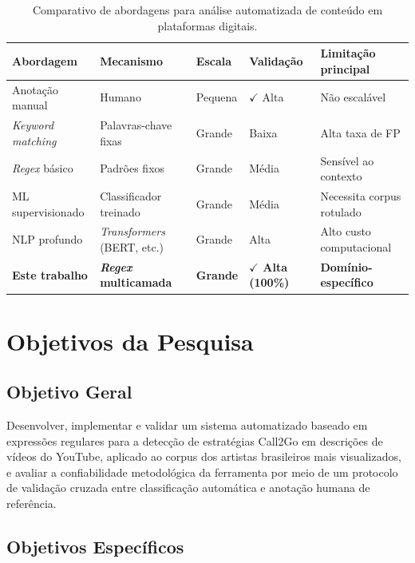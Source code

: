 \documentclass[12pt, a4paper]{article}
\begin{document}
\begin{table}[H]
\centering
\caption{Comparativo de abordagens para análise automatizada de conteúdo em plataformas digitais.}
\label{tab:literatura}
\renewcommand{\arraystretch}{1.3}
\begin{tabular}{@{}lllll@{}}
\toprule
\textbf{Abordagem} & \textbf{Mecanismo} & \textbf{Escala} & \textbf{Validação} & \textbf{Limitação principal} \\
\midrule
Anotação manual & Humano & Pequena & $\checkmark$ Alta & Não escalável \\
\textit{Keyword matching} & Palavras-chave fixas & Grande & Baixa & Alta taxa de FP \\
\textit{Regex} básico & Padrões fixos & Grande & Média & Sensível ao contexto \\
ML supervisionado & Classificador treinado & Grande & Média & Necessita corpus rotulado \\
NLP profundo & \textit{Transformers} (BERT, etc.) & Grande & Alta & Alto custo computacional \\
\textbf{Este trabalho} & \textbf{\textit{Regex} multicamada} & \textbf{Grande} & \textbf{$\checkmark$ Alta (100\%)} & \textbf{Domínio-específico} \\
\bottomrule
\end{tabular}
\end{table}

\section{Objetivos da Pesquisa}
\label{sec:objetivos}

\subsection{Objetivo Geral}

Desenvolver, implementar e validar um sistema automatizado baseado em expressões regulares para a detecção de estratégias Call2Go em descrições de vídeos do YouTube, aplicado ao corpus dos artistas brasileiros mais visualizados, e avaliar a confiabilidade metodológica da ferramenta por meio de um protocolo de validação cruzada entre classificação automática e anotação humana de referência.

\subsection{Objetivos Específicos}
\end{document}
